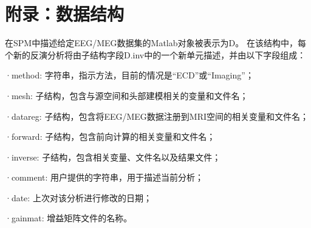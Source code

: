 \section{附录：数据结构}

在SPM中描述给定EEG/MEG数据集的Matlab对象被表示为D。
在该结构中，每个新的反演分析将由子结构字段D.inv中的一个新单元描述，并由以下字段组成：

·method: 字符串，指示方法，目前的情况是“ECD”或“Imaging”；

·mesh: 子结构，包含与源空间和头部建模相关的变量和文件名；

·datareg: 子结构，包含将EEG/MEG数据注册到MRI空间的相关变量和文件名；

·forward: 子结构，包含前向计算的相关变量和文件名；

·inverse: 子结构，包含相关变量、文件名以及结果文件；

·comment: 用户提供的字符串，用于描述当前分析；

·date: 上次对该分析进行修改的日期；

·gainmat: 增益矩阵文件的名称。